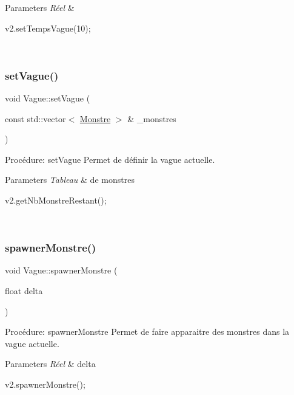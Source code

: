 \begin{DoxyParams}{Parameters}
{\em Réel} & 
\begin{DoxyCode}
v2.setTempsVague(10);
\end{DoxyCode}
 \\
\hline
\end{DoxyParams}
\mbox{\label{classVague_af6bc246e66011691775c3ceb9356ffc8}} 
\subsubsection{\texorpdfstring{set\+Vague()}{setVague()}}
{\footnotesize\ttfamily void Vague\+::set\+Vague (\begin{DoxyParamCaption}\item[{const std\+::vector$<$ \hyperlink{classMonstre}{Monstre} $>$ \&}]{\+\_\+monstres }\end{DoxyParamCaption})}



Procédure\+: set\+Vague Permet de définir la vague actuelle. 


\begin{DoxyParams}{Parameters}
{\em Tableau} & de monstres 
\begin{DoxyCode}
v2.getNbMonstreRestant();
\end{DoxyCode}
 \\
\hline
\end{DoxyParams}
\mbox{\label{classVague_a08f321266ddbf3e852b9d48975849f98}} 
\subsubsection{\texorpdfstring{spawner\+Monstre()}{spawnerMonstre()}}
{\footnotesize\ttfamily void Vague\+::spawner\+Monstre (\begin{DoxyParamCaption}\item[{float}]{delta }\end{DoxyParamCaption})}



Procédure\+: spawner\+Monstre Permet de faire apparaitre des monstres dans la vague actuelle. 


\begin{DoxyParams}{Parameters}
{\em Réel} & delta 
\begin{DoxyCode}
v2.spawnerMonstre();
\end{DoxyCode}
 \\
\hline
\end{DoxyParams}
\mbox{\label{classVague_a00fd363241fbfd6ed6819d408155a6ee}} 
